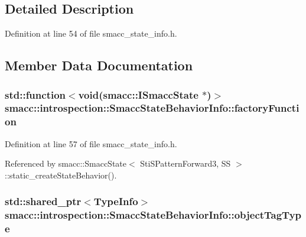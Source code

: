 \subsection{Detailed Description}


Definition at line 54 of file smacc\+\_\+state\+\_\+info.\+h.



\subsection{Member Data Documentation}
\subsubsection[{\texorpdfstring{factory\+Function}{factoryFunction}}]{\setlength{\rightskip}{0pt plus 5cm}std\+::function$<$void({\bf smacc\+::\+I\+Smacc\+State} $\ast$)$>$ smacc\+::introspection\+::\+Smacc\+State\+Behavior\+Info\+::factory\+Function}\hypertarget{structsmacc_1_1introspection_1_1SmaccStateBehaviorInfo_a966cf5a5fe5cbe839be792b04e6c7368}{}\label{structsmacc_1_1introspection_1_1SmaccStateBehaviorInfo_a966cf5a5fe5cbe839be792b04e6c7368}


Definition at line 57 of file smacc\+\_\+state\+\_\+info.\+h.



Referenced by smacc\+::\+Smacc\+State$<$ Sti\+S\+Pattern\+Forward3, S\+S $>$\+::static\+\_\+create\+State\+Behavior().

\subsubsection[{\texorpdfstring{object\+Tag\+Type}{objectTagType}}]{\setlength{\rightskip}{0pt plus 5cm}std\+::shared\+\_\+ptr$<${\bf Type\+Info}$>$ smacc\+::introspection\+::\+Smacc\+State\+Behavior\+Info\+::object\+Tag\+Type}\hypertarget{structsmacc_1_1introspection_1_1SmaccStateBehaviorInfo_ae853ad3a28609fd83aa3d395d2e4c163}{}\label{structsmacc_1_1introspection_1_1SmaccStateBehaviorInfo_ae853ad3a28609fd83aa3d395d2e4c163}


